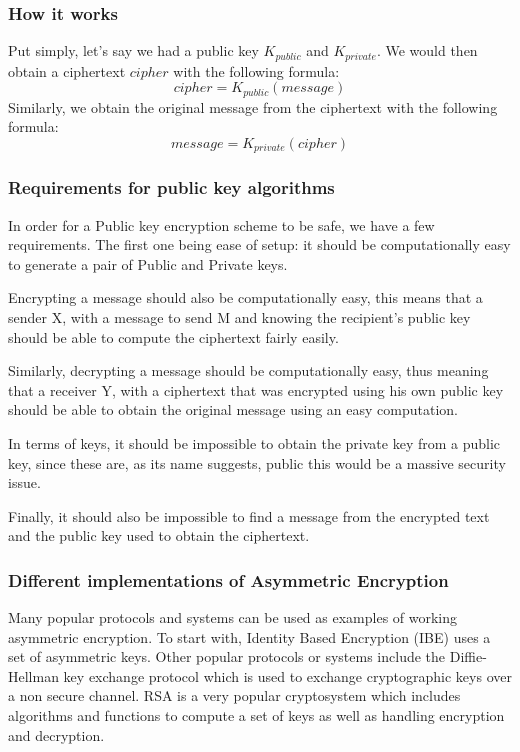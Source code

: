 \documentclass[conference]{IEEEtran}
\begin{document}
\subsubsection{How it works}
Put simply, let's say we had a public key $K_{public}$ and $K_{private}$.
We would then obtain a ciphertext $cipher$ with the following formula: 
\begin{equation*}
    cipher = K_{public}(message)
\end{equation*}
Similarly, we obtain the original message from the ciphertext with the following formula:
\begin{equation*}
    message = K_{private}(cipher)
\end{equation*}


\subsubsection{Requirements for public key algorithms}
In order for a Public key encryption scheme to be safe, we have a few requirements.
The first one being ease of setup: it should be computationally easy to generate
a pair of Public and Private keys.

Encrypting a message should also be computationally easy, this means that a 
sender X, with a message to send M and knowing the recipient's public key 
should be able to compute the ciphertext fairly easily.

Similarly, decrypting a message should be computationally easy, thus meaning that
a receiver Y, with a ciphertext that was encrypted using his own public key 
should be able to obtain the original message using an easy computation.

In terms of keys, it should be impossible to obtain the private key from a 
public key, since these are, as its name suggests, public this would be a 
massive security issue.

Finally, it should also be impossible to find a message from the encrypted text and 
the public key used to obtain the ciphertext.


\subsubsection{Different implementations of Asymmetric Encryption}
Many popular protocols and systems can be used as examples of working 
asymmetric encryption. To start with, Identity Based Encryption (IBE)
uses a set of asymmetric keys. Other popular protocols or systems include
the Diffie-Hellman key exchange protocol which is used to exchange cryptographic 
keys over a non secure channel. RSA is a very popular cryptosystem which includes
algorithms and functions to compute a set of keys as well as handling encryption and decryption.
\end{document}
